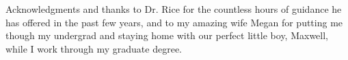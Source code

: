 \afterpage{\cleardoublepage}
%
Acknowledgments and thanks to Dr. Rice for the countless hours of guidance he has offered in the past few years, and to my amazing wife Megan for putting me though my undergrad and staying home with our perfect little boy, Maxwell, while I work through my graduate degree.